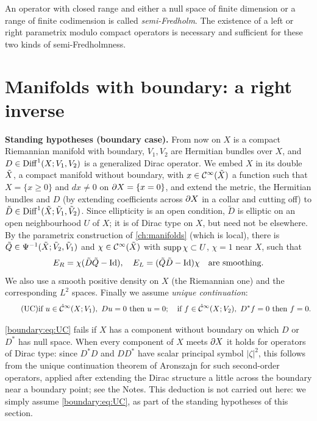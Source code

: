 An operator with closed range and either a null space of finite dimension or a
range of finite codimension is called \emph{semi-Fredholm}. The existence of a left or
right parametrix modulo compact operators is necessary and sufficient for these two
kinds of semi-Fredholmness.

\section{Manifolds with boundary: a right inverse}\label{boundary:sec:right-inverse}

\noindent\textbf{Standing hypotheses (boundary case).} From now on $X$ is a compact
Riemannian manifold with boundary, $V_1,V_2$ are Hermitian bundles over $X$, and
$D\in\operatorname{Diff}^{1}(X;V_1,V_2)$ is a generalized Dirac operator. We embed $X$ in its double
$\tilde{X}$, a compact manifold without boundary, with $x\in\mathcal{C}^\infty(\tilde{X})$ a function such that
$X=\{x\ge0\}$ and $dx\ne0$ on $\partial X=\{x=0\}$, and extend the metric, the Hermitian
bundles and $D$ (by extending coefficients across $\partial X$ in a collar and cutting
off) to $\tilde D\in\operatorname{Diff}^{1}(\tilde{X};\tilde V_1,\tilde V_2)$. Since ellipticity is an open
condition, $\tilde D$ is elliptic on an open neighbourhood $U$ of $X$; it is of Dirac
type on $X$, but need not be elsewhere. By the parametrix construction of
\cref{ch:manifolds} (which is local), there is $\tilde Q\in\Psi^{-1}(\tilde{X};\tilde V_2,
\tilde V_1)$ and $\chi\in\mathcal{C}^\infty(\tilde{X})$ with $\operatorname{supp}\chi\subset U$, $\chi=1$ near $X$, such
that
\begin{equation*}
E_R=\chi(\tilde D\tilde Q-\operatorname{Id}),\quad E_L=(\tilde Q\tilde D-\operatorname{Id})\chi\quad\text{are
smoothing.}
\end{equation*}
We also use a smooth positive density on $X$ (the Riemannian one) and the
corresponding $L^2$ spaces. Finally we assume \emph{unique continuation}:
\begin{equation}\tag{UC}\label{boundary:eq:UC}
\text{if}\ u\in\dCI(X;V_1),\ Du=0\ \text{then}\ u=0;\quad\text{if}\ f\in\dCI(X;V_2),\
D^*f=0\ \text{then}\ f=0.
\end{equation}

\begin{remark}
\eqref{boundary:eq:UC} fails if $X$ has a component without boundary on which $D$
or $D^*$ has null space. When every component of $X$ meets $\partial X$ it holds for
operators of Dirac type: since $D^*D$ and $DD^*$ have scalar principal symbol
$|\zeta|^2$, this follows from the unique continuation theorem of Aronszajn for such
second-order operators, applied after extending the Dirac structure a little across
the boundary near a boundary point; see the Notes. This deduction is not carried out
here: we simply assume \eqref{boundary:eq:UC}, as part of the standing hypotheses
of this section.
\end{remark}

